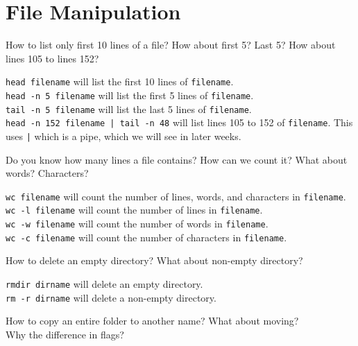\section{File Manipulation}

\begin{qs}
  How to list only first 10 lines of a file? How about first 5? Last 5?
  How about lines 105 to lines 152?
\end{qs}

\begin{ans}
  \texttt{head filename} will list the first 10 lines of \texttt{filename}. \\
  \texttt{head -n 5 filename} will list the first 5 lines of \texttt{filename}. \\
  \texttt{tail -n 5 filename} will list the last 5 lines of \texttt{filename}. \\
  \texttt{head -n 152 filename | tail -n 48} will list lines 105 to 152 of \texttt{filename}.
  This uses \texttt{|} which is a pipe, which we will see in later weeks.
\end{ans}

\begin{qs}
  Do you know how many lines a file contains? How can we count it?
  What about words? Characters?
\end{qs}

\begin{ans}
  \texttt{wc filename} will count the number of lines, words, and characters in \texttt{filename}. \\
  \texttt{wc -l filename} will count the number of lines in \texttt{filename}. \\
  \texttt{wc -w filename} will count the number of words in \texttt{filename}. \\
  \texttt{wc -c filename} will count the number of characters in \texttt{filename}.
\end{ans}

\begin{qs}
  How to delete an empty directory? What about non-empty directory?
\end{qs}

\begin{ans}
  \texttt{rmdir dirname} will delete an empty directory. \\
  \texttt{rm -r dirname} will delete a non-empty directory.
\end{ans}

\begin{qs}
  How to copy an entire folder to another name? What about moving? \\
  Why the difference in flags?
\end{qs}

